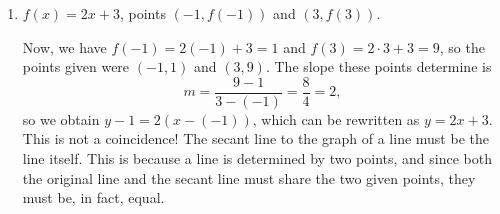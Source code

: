 \documentclass{ximera}
\begin{document}
\begin{example}
\begin{enumerate}[label=\alph*.]
\begin{explanation}
\begin{image}[2in]
		\end{image}

    \end{explanation}
  \item $f(x)=2x+3$, points $(-1,f(-1))$ and $(3,f(3))$.

    \begin{explanation}
      Now, we have $f(-1) = 2(-1)+3=1$ and $f(3) = 2\cdot 3+3=9$, so the points given were $(-1,1)$ and $(3,9)$. The slope these points determine is $$m = \frac{9-1}{3-(-1)} = \frac{8}{4} = 2,$$so we obtain $y-1=2(x-(-1))$, which can be rewritten as $y=2x+3$. This is not a coincidence! The secant line to the graph of a line must be the line itself. This is because a line is determined by two points, and since both the original line and the secant line must share the two given points, they must be, in fact, equal.
      
%
%
%
    \end{explanation}
  \end{enumerate}
\end{example}
\end{document}
